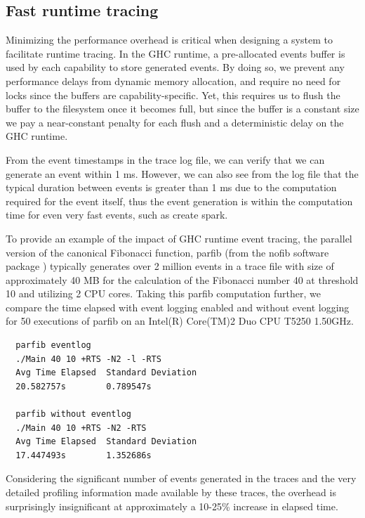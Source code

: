\documentclass[twocolumn,9pt]{sigplanconf}
\newcommand{\codef}[1]{{\fontfamily{cmss}\small#1}}
\let\cite=\citep
\begin{document}
\subsection{Fast runtime tracing}
Minimizing the performance overhead is critical when designing a system
to facilitate runtime tracing.  In the GHC runtime, a pre-allocated events buffer is 
used by each capability to store generated events.
By doing so, we prevent any performance delays from dynamic 
memory allocation, and require no need for locks since the buffers are
capability-specific.  Yet, this requires us to flush the buffer
to the filesystem once it becomes full, but since the buffer is a
constant size we pay a near-constant penalty for each flush and a
deterministic delay on the GHC runtime.

From the event timestamps in the trace log file, we can verify that we can 
generate an event within 1 ms.  However, we can also see from the log file that
the typical duration between events is greater than 1 ms due to the computation 
required for the event itself, thus the event generation is within
the computation time for even very fast events, such as create spark.

To provide an example of the impact of GHC runtime event tracing, the parallel 
version of the canonical Fibonacci function, \codef{parfib} (from
the \codef{nofib} software package \cite{nofib}) typically generates over 2 million
events in a trace file with size of approximately 40 MB for the
calculation of the Fibonacci number 40 at threshold 10 and utilizing 2 CPU cores.
Taking this parfib computation further, we compare the time elapsed with
event logging enabled and without event logging for 50 executions of
parfib on an Intel(R) Core(TM)2 Duo CPU T5250 1.50GHz.

\begin{verbatim}
  parfib eventlog 
  ./Main 40 10 +RTS -N2 -l -RTS
  Avg Time Elapsed  Standard Deviation
  20.582757s        0.789547s

  parfib without eventlog 
  ./Main 40 10 +RTS -N2 -RTS
  Avg Time Elapsed  Standard Deviation
  17.447493s        1.352686s
\end{verbatim}

Considering the significant number of events generated in the traces and
the very detailed profiling information made available by these traces, 
the overhead is surprisingly insignificant at approximately a 10-25\%
increase in elapsed time.
\end{document}
